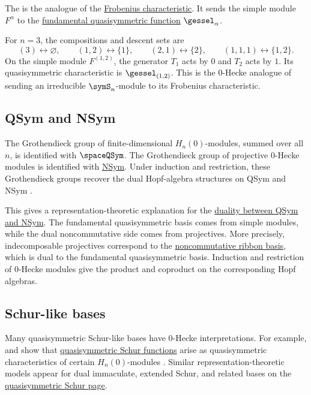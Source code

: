 The 
\label{quasisymmetricCharacteristic} is the analogue of the
\hyperref[frobeniusCharacteristic]{Frobenius characteristic}.  It sends the
simple module \(F^\alpha\) to the
\hyperref[gessel]{fundamental quasisymmetric function}
\(\gessel_\alpha\).

\begin{example}
For \(n=3\), the compositions and descent sets are
\[
  (3)\leftrightarrow\varnothing,\qquad
  (1,2)\leftrightarrow\{1\},\qquad
  (2,1)\leftrightarrow\{2\},\qquad
  (1,1,1)\leftrightarrow\{1,2\}.
\]
On the simple module \(F^{(1,2)}\), the generator \(T_1\) acts by \(0\) and
\(T_2\) acts by \(1\).  Its quasisymmetric characteristic is
\(\gessel_{(1,2)}\).  This is the 0-Hecke analogue of sending an irreducible
\(\symS_n\)-module to its Frobenius characteristic.
\end{example}

\subsection[zeroHeckeQSymNSym]{QSym and NSym}

The Grothendieck group of finite-dimensional \(H_n(0)\)-modules, summed over
all \(n\), is identified with \(\spaceQSym\).  The Grothendieck group of
projective \(0\)-Hecke modules is identified with
\hyperref[nonComFunctions]{NSym}.  Under induction and restriction, these
Grothendieck groups recover the dual Hopf-algebra structures on QSym and
NSym \cite{KrobThibon1997}.

This gives a representation-theoretic explanation for the
\hyperref[qsymNSymDuality]{duality between QSym and NSym}.  The fundamental
quasisymmetric basis comes from simple modules, while the dual
noncommutative side comes from projectives.  More precisely, indecomposable
projectives correspond to the \hyperref[nonComRibbonBasis]{noncommutative
ribbon basis}, which is dual to the fundamental quasisymmetric basis.
Induction and restriction of 0-Hecke modules give the product and coproduct
on the corresponding Hopf algebras.

\subsection[zeroHeckeSchurLike]{Schur-like bases}

Many quasisymmetric Schur-like bases have 0-Hecke interpretations.  For
example,  and  show that
\hyperref[qSchur]{quasisymmetric Schur functions} arise as quasisymmetric
characteristics of certain \(H_n(0)\)-modules
\cite{TewariWilligenburg2015}.  Similar representation-theoretic models
appear for dual immaculate, extended Schur, and related bases on the
\hyperref[qSchur]{quasisymmetric Schur page}.

